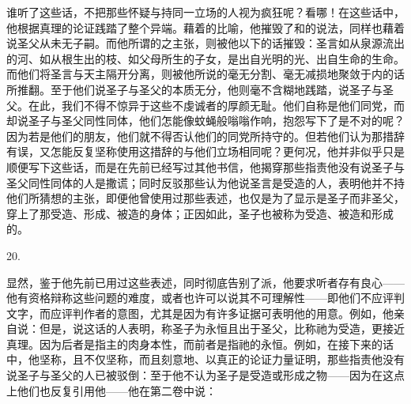 谁听了这些话，不把那些怀疑与持同一立场的人视为疯狂呢？看哪！在这些话中，他根据真理的论证践踏了整个异端。藉着的比喻，他摧毁了和的说法，同样也藉着说圣父从未无子嗣。而他所谓的之主张，则被他以下的话摧毁：圣言如从泉源流出的河、如从根生出的枝、如父母所生的子女，是出自光明的光、出自生命的生命。而他们将圣言与天主隔开分离，则被他所说的毫无分割、毫无减损地聚敛于内的话所推翻。至于他们说圣子与圣父的本质无分，他则毫不含糊地践踏，说圣子与圣父。在此，我们不得不惊异于这些不虔诚者的厚颜无耻。他们自称是他们同党，而却说圣子与圣父同性同体，他们怎能像蚊蝇般嗡嗡作响，抱怨写下了是不对的呢？因为若是他们的朋友，他们就不得否认他们的同党所持守的。但若他们认为那措辞有误，又怎能反复坚称使用这措辞的与他们立场相同呢？更何况，他并非似乎只是顺便写下这些话，而是在先前已经写过其他书信，他揭穿那些指责他没有说圣子与圣父同性同体的人是撒谎；同时反驳那些认为他说圣言是受造的人，表明他并不持他们所猜想的主张，即便他曾使用过那些表述，也仅是为了显示是圣子而非圣父，穿上了那受造、形成、被造的身体；正因如此，圣子也被称为受造、被造和形成的。\par

20. \par

显然，鉴于他先前已用过这些表述，同时彻底告别了派，他要求听者存有良心——他有资格辩称这些问题的难度，或者也许可以说其不可理解性——即他们不应评判文字，而应评判作者的意图，尤其是因为有许多证据可表明他的用意。例如，他亲自说：但是，说这话的人表明，称圣子为永恒且出于圣父，比称祂为受造，更接近真理。因为后者是指主的肉身本性，而前者是指祂的永恒。例如，在接下来的话中，他坚称，且不仅坚称，而且刻意地、以真正的论证力量证明，那些指责他没有说圣子与圣父的人已被驳倒：至于他不认为圣子是受造或形成之物——因为在这点上他们也反复引用他——他在第二卷中说：\par

